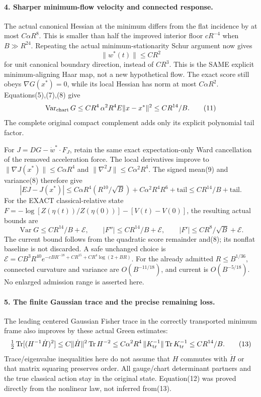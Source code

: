 \documentclass[11pt]{article}
\begin{document}
\paragraph{4. Sharper minimum-flow velocity and connected response.}
The actual canonical Hessian at the minimum differs from the flat incidence
by at most $C\alpha R^8$. This is smaller than half the improved interior
floor $cR^{-4}$ when $B\gg R^{24}$. Repeating the actual minimum-stationarity
Schur argument now gives
\[
 \|w^*(t)\|\le CR^2                                                    \tag{10}
\]
for unit canonical boundary direction, instead of $CR^3$. This is the SAME
explicit minimum-aligning Haar map, not a new hypothetical flow.
The exact score still obeys $\nabla G(x^*)=0$, while its local Hessian has
norm at most $C\alpha R^2$. Equations(5),(7),(8) give
\[
 \operatorname{Var}_{\rm chart}G
 \le CR^4\,\alpha^2R^4 E\|x-x^*\|^2\le CR^{14}/B.                     \tag{11}
\]
The complete original compact complement adds only its explicit polynomial
tail factor.

For $J=DG-\dot w^*\cdot F_J$, retain the same exact expectation-only Ward
cancellation of the removed acceleration force. The local derivatives improve
to $\|\nabla J(x^*)\|\le C\alpha R^4$ and
$\|\nabla^2J\|\le C\alpha^2R^4$. The signed mean(9) and variance(8) therefore
give
\[
 |EJ-J(x^*)|\le C\alpha R^4(R^{10}/\sqrt B)
                    +C\alpha^2R^4R^6+\text{tail}\le CR^{14}/B+\text{tail}.
\]
For the EXACT classical-relative state
$F=-\log[Z(\eta(t))/Z(\eta(0))]-[V(t)-V(0)]$, the resulting actual bounds are
\[
 \boxed{\operatorname{Var}G\le CR^{14}/B+\mathcal E,\qquad
        |F''|\le CR^{14}/B+\mathcal E,\qquad
        |F'|\le CR^8/\sqrt B+\mathcal E.}                              \tag{12}
\]
The current bound follows from the quadratic score remainder and(8); its
nonflat baseline is not discarded. A safe unchanged choice is
$\mathcal E=CB^3R^{40}e^{-cBR^{-18}+CR^{15}+CR^4\log(2+BR)}$.
For the already admitted $R\le B^{1/36}$, connected curvature and variance
are $O(B^{-11/18})$, and current is $O(B^{-5/18})$. No enlarged admission
range is asserted here.

\paragraph{5. The finite Gaussian trace and the precise remaining loss.}
The leading centered Gaussian Fisher trace in the correctly transported
minimum frame also improves by these actual Green estimates:
\[
 \tfrac12\operatorname{Tr}[(H^{-1}\dot H)^2]
 \le C\|\dot H\|^2\operatorname{Tr}H^{-2}
 \le C\alpha^2R^4\,\|K_{\rm tr}^{-1}\|
                            \operatorname{Tr}K_{\rm tr}^{-1}
 \le CR^{14}/B.                                                       \tag{13}
\]
Trace/eigenvalue inequalities here do not assume that $H$ commutes with
$\dot H$ or that matrix squaring preserves order. All gauge/chart determinant
partners and the true classical action stay in the original state. Equation(12)
was proved directly from the nonlinear law, not inferred from(13).
\end{document}
